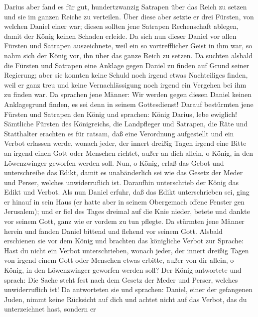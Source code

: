  Darius aber fand es für gut, hundertzwanzig Satrapen über
das Reich zu setzen und sie im ganzen Reiche zu verteilen.
 Über diese aber setzte er drei Fürsten, von welchen
Daniel einer war; diesen sollten jene Satrapen Rechenschaft ablegen,
damit der König keinen Schaden erleide.  Da sich nun
dieser Daniel vor allen Fürsten und Satrapen auszeichnete, weil ein so
vortrefflicher Geist in ihm war, so nahm sich der König vor, ihn über
das ganze Reich zu setzen.  Da suchten alsbald die Fürsten
und Satrapen eine Anklage gegen Daniel zu finden auf Grund seiner
Regierung; aber sie konnten keine Schuld noch irgend etwas Nachteiliges
finden, weil er ganz treu und keine Vernachlässigung noch irgend ein
Vergehen bei ihm zu finden war.  Da sprachen jene Männer:
Wir werden gegen diesen Daniel keinen Anklagegrund finden, es sei denn
in seinem Gottesdienst!  Darauf bestürmten jene Fürsten
und Satrapen den König und sprachen: König Darius, lebe ewiglich!
 Sämtliche Fürsten des Königreichs, die Landpfleger und
Satrapen, die Räte und Statthalter erachten es für ratsam, daß eine
Verordnung aufgestellt und ein Verbot erlassen werde, wonach jeder, der
innert dreißig Tagen irgend eine Bitte an irgend einen Gott oder
Menschen richtet, außer an dich allein, o König, in den Löwenzwinger
geworfen werden soll.  Nun, o König, erlaß das Gebot und
unterschreibe das Edikt, damit es unabänderlich sei wie das Gesetz der
Meder und Perser, welches unwiderruflich ist.  Daraufhin
unterschrieb der König das Edikt und Verbot.  Als nun
Daniel erfuhr, daß das Edikt unterschrieben sei, ging er hinauf in sein
Haus (er hatte aber in seinem Obergemach offene Fenster gen Jerusalem);
und er fiel des Tages dreimal auf die Knie nieder, betete und dankte vor
seinem Gott, ganz wie er vordem zu tun pflegte.  Da
stürmten jene Männer herein und fanden Daniel bittend und flehend vor
seinem Gott.  Alsbald erschienen sie vor dem König und
brachten das königliche Verbot zur Sprache: Hast du nicht ein Verbot
unterschrieben, wonach jeder, der innert dreißig Tagen von irgend einem
Gott oder Menschen etwas erbitte, außer von dir allein, o König, in den
Löwenzwinger geworfen werden soll? Der König antwortete und sprach: Die
Sache steht fest nach dem Gesetz der Meder und Perser, welches
unwiderruflich ist!  Da antworteten sie und sprachen:
Daniel, einer der gefangenen Juden, nimmt keine Rücksicht auf dich und
achtet nicht auf das Verbot, das du unterzeichnet hast, sondern er
